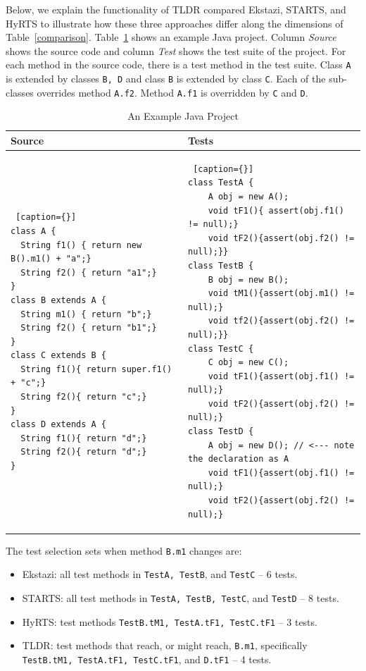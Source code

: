Below, we explain the functionality of TLDR compared Ekstazi, STARTS, and HyRTS to illustrate how these three approaches differ along the dimensions of Table~\ref{comparison}. Table~\ref{example} shows an example Java project. Column \textit{Source} shows the source code and column \textit{Test} shows the test suite of the project. For each method in the source code, there is a test method in the test suite. Class \texttt{A} is extended by classes \texttt{B, D} and class \texttt{B} is extended by class \texttt{C}. Each of the sub-classes overrides method \texttt{A.f2}. Method \texttt{A.f1} is overridden by \texttt{C} and \texttt{D}. 

\begin{table}
{\fontsize{12pt}{12pt}\selectfont
\centering
\caption{An Example Java Project}
\begin{tabular}{|p{0.5\linewidth}|p{0.5\linewidth}|}
\hline
\textbf{Source} & \textbf{Tests}  \\
\hline
\begin{lstlisting} [caption={}]
class A {
  String f1() { return new B().m1() + "a";}
  String f2() { return "a1";}
}
class B extends A {
  String m1() { return "b";}
  String f2() { return "b1";}
}
class C extends B {
  String f1(){ return super.f1() + "c";}
  String f2(){ return "c";}
}
class D extends A {
  String f1(){ return "d";}
  String f2(){ return "d";}
}
\end{lstlisting}

& 
\begin{lstlisting} [caption={}]
class TestA {
    A obj = new A();
    void tF1(){ assert(obj.f1() != null);}
    void tF2(){assert(obj.f2() != null);}}
class TestB {
    B obj = new B();
    void tM1(){assert(obj.m1() != null);} 
    void tf2(){assert(obj.f2() != null);}}
class TestC {
    C obj = new C();
    void tF1(){assert(obj.f1() != null);}
    void tF2(){assert(obj.f2() != null);} 
class TestD {
    A obj = new D(); // <--- note the declaration as A
    void tF1(){assert(obj.f1() != null);}
    void tF2(){assert(obj.f2() != null);}
\end{lstlisting}
\\
\hline
\end{tabular}
\label{example}
}
\end{table}

The test selection sets when method \texttt{B.m1} changes are: 
\begin{itemize}
	\item Ekstazi: all test methods in \texttt{TestA, TestB}, and \texttt{TestC} -- 6 tests.
	
	\item STARTS: all test methods in \texttt{TestA, TestB, TestC}, and \texttt{TestD} -- 8 tests.
	
	\item HyRTS: test methods \texttt{TestB.tM1, TestA.tF1, TestC.tF1} -- 3 tests.
	
	\item TLDR: test methods that reach, or might reach, \texttt{B.m1}, specifically \texttt{TestB.tM1, TestA.tF1, TestC.tF1}, and \texttt{D.tF1} -- 4 tests.
\end{itemize}

